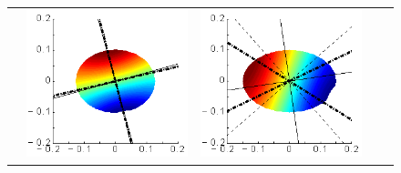 \documentclass[a4paper,11pt]{article}
\begin{document}
\begin{figure}[h]
\begin{tabular*}{1\textwidth}{c|cc|cc|}
\begin{minipage}{0.22\textwidth}
\end{minipage} &
\begin{minipage}{0.22\textwidth}
	\includegraphics[width=1\linewidth]{./images/SAFE/SAFE_BS_10x8_HTI_45/P_a_5_5kHz-pstool.eps}	
\end{minipage} &
\begin{minipage}{0.22\textwidth}
	\includegraphics[width=1\linewidth]{./images/SAFE/SAFE_BS_15x10_HTI_45/P_a_3_3kHz-pstool.eps}		

\end{minipage}
\end{tabular*}
\end{figure}
\end{document}
